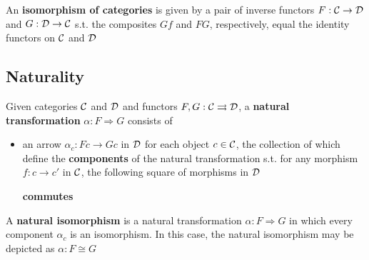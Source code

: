 \documentclass[11pt]{article}
\begin{document}
An \textbf{isomorphism of categories} is given by a pair of inverse functors \(F:\mathcal{C}\to\mathcal{D}\) and \(G:\mathcal{D}\to\mathcal{C}\) s.t.
the composites \(Gf\) and \(FG\), respectively, equal the identity functors on \(\mathcal{C}\) and \(\mathcal{D}\)
\subsection{Naturality}
\label{sec:orgb117201}
\begin{definition}[]
Given categories \(\mathcal{C}\) and \(\mathcal{D}\) and functors \(F,G:\mathcal{C}\rightrightarrows\mathcal{D}\), a \textbf{natural
transformation} \(\alpha:F\Rightarrow G\) consists of
\begin{itemize}
\item an arrow \(\alpha_c:Fc\to Gc\) in \(\mathcal{D}\) for each object \(c\in\mathcal{C}\), the collection of which define the
\textbf{components} of the natural transformation s.t. for any morphism \(f:c\to c'\) in \(\mathcal{C}\), the
following square of morphisms in \(\mathcal{D}\)
\begin{center}\end{center}
\textbf{commutes}
\end{itemize}


A \textbf{natural isomorphism} is a natural transformation \(\alpha:F\Rightarrow G\) in which every component \(\alpha_c\) is
an isomorphism. In this case, the natural isomorphism may be depicted as \(\alpha:F\cong G\)

\begin{center}\end{center}
\end{definition}
\end{document}
